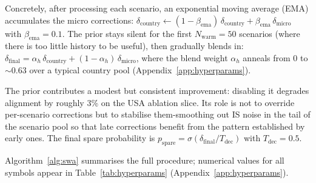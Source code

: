 \documentclass{article}
\begin{document}
Concretely, after processing each scenario, an exponential moving average (EMA)
accumulates the micro corrections:
$\delta_{\mathrm{country}} \leftarrow (1{-}\beta_{\mathrm{ema}})\,
\delta_{\mathrm{country}} + \beta_{\mathrm{ema}}\,\delta_{\mathrm{micro}}$
with $\beta_{\mathrm{ema}}{=}0.1$. The prior stays silent for the first
$N_{\mathrm{warm}}{=}50$ scenarios (where there is too little history to be
useful), then gradually blends in:
$\delta_{\mathrm{final}} = \alpha_h\,\delta_{\mathrm{country}} +
(1{-}\alpha_h)\,\delta_{\mathrm{micro}}$, where the blend weight $\alpha_h$
anneals from 0 to ${\sim}0.63$ over a typical country pool
(Appendix~\ref{app:hyperparams}).

The prior contributes a modest but consistent improvement: disabling it
degrades alignment by roughly 3\% on the USA ablation slice. Its role is not to
override per-scenario corrections but to stabilise them-smoothing out IS noise
in the tail of the scenario pool so that late corrections benefit from the
pattern established by early ones. The final spare probability is
$p_{\text{spare}} = \sigma(\delta_{\mathrm{final}} / T_{\text{dec}})$ with
$T_{\text{dec}}{=}0.5$.

Algorithm~\ref{alg:swa} summarises the full procedure; numerical values for all
symbols appear in Table~\ref{tab:hyperparams} (Appendix~\ref{app:hyperparams}).
\end{document}
